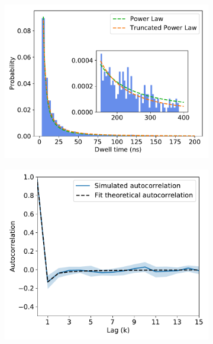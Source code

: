 \documentclass{article}
\begin{document}
\begin{figure}[htb!]
\begin{subfigure}{0.3\textwidth}
  \includegraphics[width=\textwidth]{GCL_powerlaw.pdf}
  \caption{}\label{fig:GCL_powerlaw}
  \end{subfigure}
  \begin{subfigure}{0.3\textwidth}
  \includegraphics[width=\textwidth]{GCL_hop_acf.pdf}
  \caption{}\label{fig:GCL_hop_acf}
  \end{subfigure}
  \begin{subfigure}{0.3\textwidth}

\end{subfigure}
\end{figure}
\end{document}
